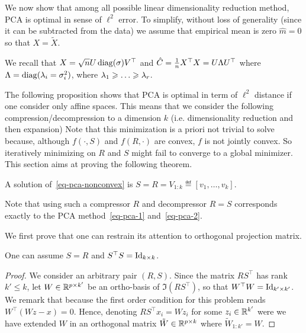 We now show that among all possible linear dimensionality reduction method, PCA is optimal in sense of $\ell^2$ error. 
%
To simplify, without loss of generality (since it can be subtracted from the data) we assume that empirical mean is zero $\hat m=0$ so that $X=\tilde X$. 

We recall that $X=\sqrt{n} U \operatorname{diag}(\sigma) V^\top$ and $\hat C = \frac{1}{n} X^\top X = U \Lambda U^\top$ where $\Lambda = \operatorname{diag}(\lambda_i=\sigma_i^2)$, where $\lambda_1 \geqslant \ldots \geqslant \lambda_r$.  

The following proposition shows that PCA is optimal in term of $\ell^2$ distance if one consider only affine spaces. This means that we consider the following compression/decompression to a dimension $k$ (i.e. dimensionality reduction and then expansion) 
Note that this minimization is a priori not trivial to solve because, although $f(\cdot,S)$ and $f(R,\cdot)$ are convex, $f$ is not jointly convex. So iteratively minimizing on $R$ and $S$ might fail to converge to a global minimizer.
%
This section aims at proving the following theorem.

\begin{thm}\label{thm-pca-optim}
	A solution of~\eqref{eq-pca-nonconvex} is $S=R=V_{1:k} \eqdef [v_1,\ldots,v_k]$.
\end{thm}

Note that using such a compressor $R$ and decompressor $R=S$ corresponds exactly to the PCA method~\eqref{eq-pca-1} and~\eqref{eq-pca-2}.

We first prove that one can restrain its attention to orthogonal projection matrix.

\begin{lem}
	One can assume $S=R$ and $S^\top S = \mathrm{Id}_{k\times k}$.
\end{lem}
\begin{proof}
	We consider an arbitrary pair $(R,S)$. Since the matrix $R S^\top$ has rank $k' \leq k$, let $W \in \mathbb{R}^{p \times k'}$ be an ortho-basis of $\Im(RS^\top)$, so that $W^\top W = \mathrm{Id}_{k' \times k'}$. We remark that 
	because the first order condition for this problem reads $W^\top(Wz-x)=0$.
	Hence, denoting $RS^\top x_i = Wz_i$ for some $z_i \in \mathbb{R}^{k'}$
	were we have extended $W$ in an orthogonal matrix $\tilde W \in \mathbb{R}^{p \times k}$ where $\tilde W_{1:k'}=W$.
\end{proof}

